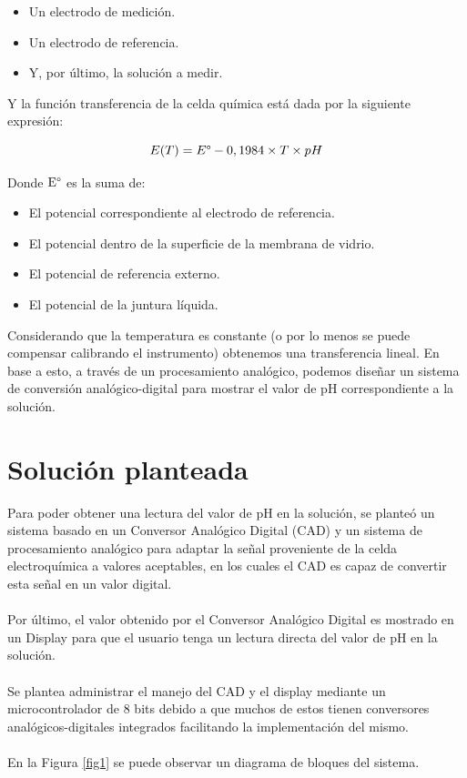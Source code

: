 \documentclass[10pt,a4paper]{article}
\begin{document}
\begin{itemize}
	\item {Un electrodo de medición.}
	\item {Un electrodo de referencia.}
	\item {Y, por último, la solución a medir.}
\end{itemize}

Y la función transferencia de la celda química está dada por la siguiente expresión:

\begin{equation}
	E(T) = E\degree - 0,1984\times T \times pH \nonumber
\end{equation}

Donde $\mathrm{E\degree}$ es la suma de:

\begin{itemize}
	\item {El potencial correspondiente al electrodo de referencia.}
	\item {El potencial dentro de la superficie de la membrana de vidrio.}
	\item {El potencial de referencia externo.}
	\item {El potencial de la juntura líquida.}
\end{itemize}

Considerando que la temperatura es constante (o por lo menos se puede compensar calibrando el instrumento) obtenemos una transferencia lineal. En base a esto, a través de un procesamiento analógico, podemos diseñar un sistema de conversión analógico-digital para mostrar el valor de pH correspondiente a la solución.

\clearpage

\section{Solución planteada}

Para poder obtener una lectura del valor de pH en la solución, se planteó un sistema basado en un Conversor Analógico Digital (CAD) y un sistema de procesamiento analógico para adaptar la señal proveniente de la celda electroquímica a valores aceptables, en los cuales el CAD es capaz de convertir esta señal en un valor digital.\\
\\
Por último, el valor obtenido por el Conversor Analógico Digital es mostrado en un Display para que el usuario tenga un lectura directa del valor de pH en la solución.\\
\\
Se plantea administrar el manejo del CAD y el display mediante un microcontrolador de 8 bits debido a que muchos de estos tienen conversores analógicos-digitales integrados facilitando la implementación del mismo.\\
\\
En la Figura \ref{fig1} se puede observar un diagrama de bloques del sistema.

\begin{figure}[h!]
	\begin{center}
		\begin{tikzpicture}
			
		\end{tikzpicture}
	\end{center}
\end{figure}
\end{document}
